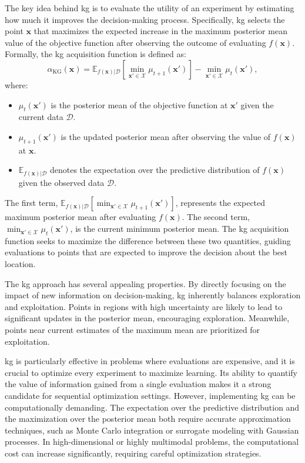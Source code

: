 The key idea behind \ac{kg} is to evaluate the utility of an experiment by estimating how much it improves the decision-making process. Specifically, \ac{kg} selects the point $\mathbf{x}$ that maximizes the expected increase in the maximum posterior mean value of the objective function after observing the outcome of evaluating $f(\mathbf{x})$. Formally, the \ac{kg} acquisition function is defined as:
\begin{equation}
    \alpha_{\text{KG}}(\mathbf{x}) = \mathbb{E}_{f(\mathbf{x})|\mathcal{D}} \left[ \min_{\mathbf{x}' \in \mathcal{X}} \mu_{t+1}(\mathbf{x}') \right] - \min_{\mathbf{x}' \in \mathcal{X}} \mu_t(\mathbf{x}'),
\end{equation}
where:
\begin{itemize}
    \item $\mu_t(\mathbf{x}')$ is the posterior mean of the objective function at $\mathbf{x}'$ given the current data $\mathcal{D}$.
    \item $\mu_{t+1}(\mathbf{x}')$ is the updated posterior mean after observing the value of $f(\mathbf{x})$ at $\mathbf{x}$.
    \item $\mathbb{E}_{f(\mathbf{x})|\mathcal{D}}$ denotes the expectation over the predictive distribution of $f(\mathbf{x})$ given the observed data $\mathcal{D}$.
\end{itemize}

The first term, $\mathbb{E}_{f(\mathbf{x})|\mathcal{D}} \left[ \min_{\mathbf{x}' \in \mathcal{X}} \mu_{t+1}(\mathbf{x}') \right]$, represents the expected maximum posterior mean after evaluating $f(\mathbf{x})$. The second term, $\min_{\mathbf{x}' \in \mathcal{X}} \mu_t(\mathbf{x}')$, is the current minimum posterior mean. The \ac{kg} acquisition function seeks to maximize the difference between these two quantities, guiding evaluations to points that are expected to improve the decision about the best location.

The \ac{kg} approach has several appealing properties. By directly focusing on the impact of new information on decision-making, \ac{kg} inherently balances exploration and exploitation. Points in regions with high uncertainty are likely to lead to significant updates in the posterior mean, encouraging exploration. Meanwhile, points near current estimates of the maximum mean are prioritized for exploitation.

\ac{kg} is particularly effective in problems where evaluations are expensive, and it is crucial to optimize every experiment to maximize learning. Its ability to quantify the value of information gained from a single evaluation makes it a strong candidate for sequential optimization settings. However, implementing \ac{kg} can be computationally demanding. The expectation over the predictive distribution and the maximization over the posterior mean both require accurate approximation techniques, such as Monte Carlo integration or surrogate modeling with Gaussian processes. In high-dimensional or highly multimodal problems, the computational cost can increase significantly, requiring careful optimization strategies.


